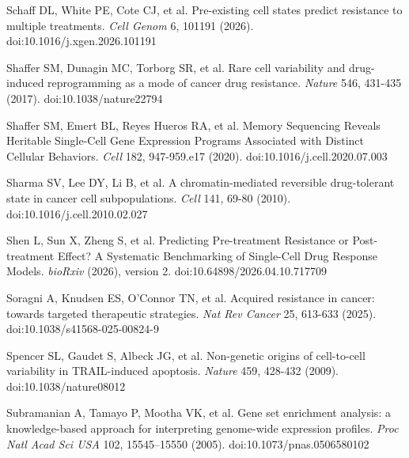 \documentclass[11pt,a4paper]{article}
\begin{document}
\noindent Schaff DL, White PE, Cote CJ, et al. Pre-existing cell states predict resistance to multiple treatments. \emph{Cell Genom} 6, 101191 (2026). doi:10.1016/j.xgen.2026.101191 \par\vspace{2pt}

\noindent Shaffer SM, Dunagin MC, Torborg SR, et al. Rare cell variability and drug-induced reprogramming as a mode of cancer drug resistance. \emph{Nature} 546, 431-435 (2017). doi:10.1038/nature22794 \par\vspace{2pt}

\noindent Shaffer SM, Emert BL, Reyes Hueros RA, et al. Memory Sequencing Reveals Heritable Single-Cell Gene Expression Programs Associated with Distinct Cellular Behaviors. \emph{Cell} 182, 947-959.e17 (2020). doi:10.1016/j.cell.2020.07.003 \par\vspace{2pt}

\noindent Sharma SV, Lee DY, Li B, et al. A chromatin-mediated reversible drug-tolerant state in cancer cell subpopulations. \emph{Cell} 141, 69-80 (2010). doi:10.1016/j.cell.2010.02.027 \par\vspace{2pt}

\noindent Shen L, Sun X, Zheng S, et al. Predicting Pre-treatment Resistance or Post-treatment Effect? A Systematic Benchmarking of Single-Cell Drug Response Models. \emph{bioRxiv} (2026), version 2. doi:10.64898/2026.04.10.717709 \par\vspace{2pt}

\noindent Soragni A, Knudsen ES, O'Connor TN, et al. Acquired resistance in cancer: towards targeted therapeutic strategies. \emph{Nat Rev Cancer} 25, 613-633 (2025). doi:10.1038/s41568-025-00824-9 \par\vspace{2pt}

\noindent Spencer SL, Gaudet S, Albeck JG, et al. Non-genetic origins of cell-to-cell variability in TRAIL-induced apoptosis. \emph{Nature} 459, 428-432 (2009). doi:10.1038/nature08012 \par\vspace{2pt}

\noindent Subramanian A, Tamayo P, Mootha VK, et al. Gene set enrichment analysis: a knowledge-based approach for interpreting genome-wide expression profiles. \emph{Proc Natl Acad Sci USA} 102, 15545--15550 (2005). doi:10.1073/pnas.0506580102\par\vspace{2pt}
\end{document}
